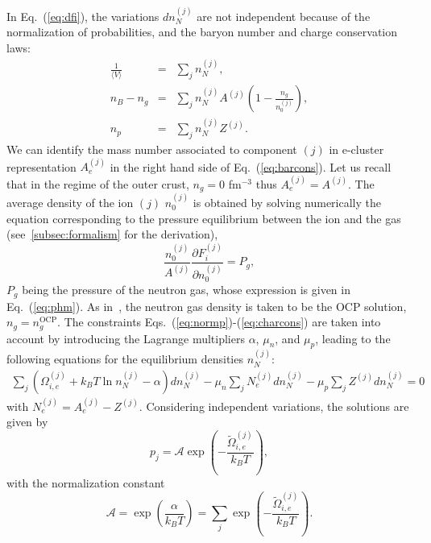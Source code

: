 In Eq.~(\ref{eq:dfi}), the variations $dn_N^{(j)}$ are not independent because 
of the normalization of probabilities, and the baryon number and charge 
conservation laws:
%
\begin{eqnarray}
  \frac{1}{\langle V\rangle} &=& \sum_j n_N^{(j)},\label{eq:normp}\\
  n_B - n_g &=& 
  \sum_j n_N^{(j)} A^{(j)}
  \left(1-\frac{n_g}{n_0^{(j)}}\right),\label{eq:barcons}\\
  n_p &=& \sum_j n_N^{(j)} Z^{(j)}\label{eq:charcons}.
\end{eqnarray}
%
We can identify the mass number associated to component $(j)$ in e-cluster 
representation $A_e^{(j)}$ in the right hand side of Eq.~(\ref{eq:barcons}).
Let us recall that in the regime of the outer crust, $n_g = 0$ fm$^{-3}$ thus
$A_e^{(j)} = A^{(j)}$. The average density of the ion $(j)$ $n_0^{(j)}$ is
obtained by solving numerically the equation corresponding to the pressure 
equilibrium between the ion and the gas (see~\ref{subsec:formalism} for the 
derivation),
%
\begin{equation}
  \frac{n_0^{(j)}}{A^{(j)}}\frac{\partial F_i^{(j)}} {\partial n_0^{(j)}} 
  = P_g,
\end{equation}
%
$P_g$ being the pressure of the neutron gas, whose expression is given in 
Eq.~(\ref{eq:phm}). As in~\cite{Grams2018}, the neutron gas density is taken to 
be the OCP solution, $n_g = n_g^{\text{OCP}}$.
The constraints Eqs.~(\ref{eq:normp})-(\ref{eq:charcons}) are taken into 
account by introducing the Lagrange multipliers $\alpha$, $\mu_n$, and $\mu_p$, 
leading to the following equations for the equilibrium densities $n_N^{(j)}$:
%
\begin{eqnarray}
  \sum_j \left(\Omega_{i,e}^{(j)} + k_B T \ln n_N^{(j)} 
  - \alpha\right)dn_N^{(j)} 
  - \mu_n \sum_j N_e^{(j)}dn_N^{(j)} - \mu_p \sum_j Z^{(j)} dn_N^{(j)}  
  = 0
\end{eqnarray}
%
with $N_e^{(j)} = A_e^{(j)} - Z^{(j)}$.
Considering independent variations, the solutions are given by
%
\begin{equation}
  p_j = \mathcal{A}\exp\left(-\frac{\tilde{\Omega}_{i,e}^{(j)}}{k_B
  T}\right),\label{eq:pj}
\end{equation}
%
with the normalization constant
%
\begin{equation}
  \mathcal{A} = \exp\left(\frac{\alpha}{k_B T}\right) = \sum_j
  \exp\left(-\frac{\tilde{\Omega}_{i,e}^{(j)}}{k_B T}\right).
\end{equation}
